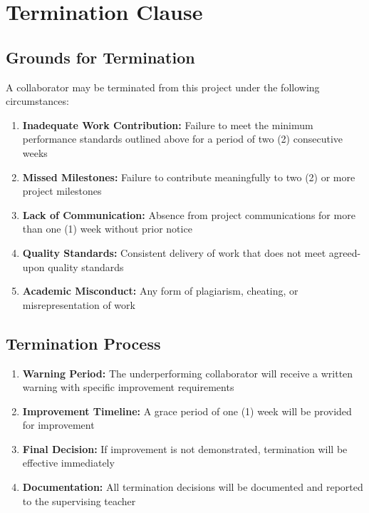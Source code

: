 \documentclass[12pt,a4paper]{article}
\begin{document}
\vspace{1cm}

\section*{Termination Clause}

\subsection*{Grounds for Termination}

A collaborator may be terminated from this project under the following circumstances:

\begin{enumerate}
    \item \textbf{Inadequate Work Contribution:} Failure to meet the minimum performance standards outlined above for a period of two (2) consecutive weeks
    \item \textbf{Missed Milestones:} Failure to contribute meaningfully to two (2) or more project milestones
    \item \textbf{Lack of Communication:} Absence from project communications for more than one (1) week without prior notice
    \item \textbf{Quality Standards:} Consistent delivery of work that does not meet agreed-upon quality standards
    \item \textbf{Academic Misconduct:} Any form of plagiarism, cheating, or misrepresentation of work
\end{enumerate}

\subsection*{Termination Process}

\begin{enumerate}
    \item \textbf{Warning Period:} The underperforming collaborator will receive a written warning with specific improvement requirements
    \item \textbf{Improvement Timeline:} A grace period of one (1) week will be provided for improvement
    \item \textbf{Final Decision:} If improvement is not demonstrated, termination will be effective immediately
    \item \textbf{Documentation:} All termination decisions will be documented and reported to the supervising teacher
\end{enumerate}
\end{document}
